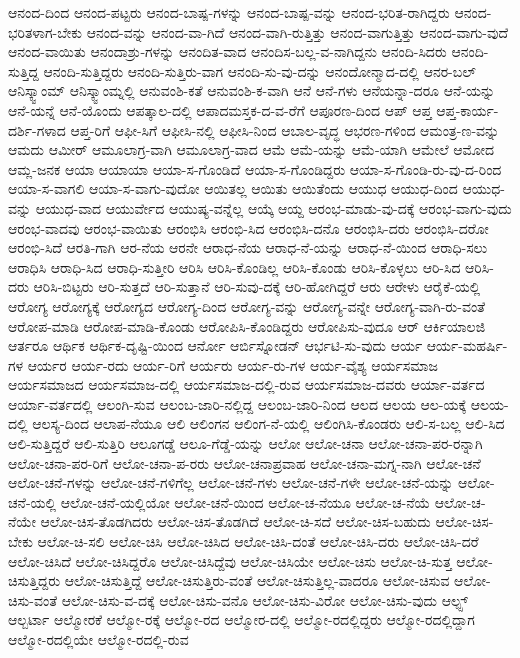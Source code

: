 {ಆನಂದ-ದಿಂದ
ಆನಂದ-ಪಟ್ಟರು
ಆನಂದ-ಬಾಷ್ಪ-ಗಳನ್ನು
ಆನಂದ-ಬಾಷ್ಪ-ವನ್ನು
ಆನಂದ-ಭರಿತ-ರಾಗಿದ್ದರು
ಆನಂದ-ಭರಿತಳಾಗ-ಬೇಕು
ಆನಂದ-ವನ್ನು
ಆನಂದ-ವಾ-ಗಿದೆ
ಆನಂದ-ವಾಗಿ-ರುತ್ತಿತ್ತು
ಆನಂದ-ವಾಗುತ್ತಿತ್ತು
ಆನಂದ-ವಾಗು-ವುದೆ
ಆನಂದ-ವಾಯಿತು
ಆನಂದಾಶ್ರು-ಗಳನ್ನು
ಆನಂದಿತ-ವಾದ
ಆನಂದಿಸ-ಬಲ್ಲ-ವ-ನಾಗಿದ್ದನು
ಆನಂದಿ-ಸಿದರು
ಆನಂದಿ-ಸುತ್ತಿದ್ದ
ಆನಂದಿ-ಸುತ್ತಿದ್ದರು
ಆನಂದಿ-ಸುತ್ತಿರು-ವಾಗ
ಆನಂದಿ-ಸು-ವು-ದನ್ನು
ಆನಂದೋನ್ಮಾದ-ದಲ್ಲಿ
ಆನರ-ಬಲ್
ಆನಿಸ್ಕ್ವಾಂಮ್
ಆನಿಸ್ಕ್ವಾಂಮ್ನಲ್ಲಿ
ಆನುವಂಶಿ-ಕತೆ
ಆನುವಂಶಿ-ಕ-ವಾಗಿ
ಆನೆ
ಆನೆ-ಗಳು
ಆನೆಯನ್ನಾ-ದರೂ
ಆನೆ-ಯನ್ನು
ಆನೆ-ಯನ್ನೆ
ಆನೆ-ಯೊಂದು
ಆಪತ್ಕಾಲ-ದಲ್ಲಿ
ಆಪಾದಮಸ್ತಕ-ದ-ವ-ರೆಗೆ
ಆಪೂರಣ-ದಿಂದ
ಆಪ್
ಆಪ್ತ
ಆಪ್ತ-ಕಾರ್ಯ-ದರ್ಶಿ-ಗಳಾದ
ಆಪ್ತ-ರಿಗೆ
ಆಫೀ-ಸಿಗೆ
ಆಫೀಸಿ-ನಲ್ಲಿ
ಆಫೀಸಿ-ನಿಂದ
ಆಬಾಲ-ವೃದ್ಧ
ಆಭರಣ-ಗಳಿಂದ
ಆಮಂತ್ರ-ಣ-ವನ್ನು
ಆಮದು
ಆಮೀರ್
ಆಮೂಲಾಗ್ರ-ವಾಗಿ
ಆಮೂಲಾಗ್ರ-ವಾದ
ಆಮೆ
ಆಮೆ-ಯನ್ನು
ಆಮೆ-ಯಾಗಿ
ಆಮೇಲೆ
ಆಮೋದ
ಆಮ್ಲ-ಜನಕ
ಆಯಾ
ಆಯಾಯಾ
ಆಯಾ-ಸ-ಗೊಂಡಿದೆ
ಆಯಾ-ಸ-ಗೊಂಡಿದ್ದರು
ಆಯಾ-ಸ-ಗೊಂಡಿ-ರು-ವು-ದ-ರಿಂದ
ಆಯಾ-ಸ-ವಾಗಲಿ
ಆಯಾ-ಸ-ವಾಗು-ವುದೋ
ಆಯಿತಲ್ಲ
ಆಯಿತು
ಆಯಿತೆಂದು
ಆಯುಧ
ಆಯುಧ-ದಿಂದ
ಆಯುಧ-ವನ್ನು
ಆಯುಧ-ವಾದ
ಆಯುರ್ವೇದ
ಆಯುಷ್ಯ-ವನ್ನೆಲ್ಲ
ಆಯ್ಕೆ
ಆಯ್ದ
ಆರಂಭ-ಮಾಡು-ವು-ದಕ್ಕೆ
ಆರಂಭ-ವಾಗು-ವುದು
ಆರಂಭ-ವಾದವು
ಆರಂಭ-ವಾಯಿತು
ಆರಂಭಿಸಿ
ಆರಂಭಿ-ಸಿದ
ಆರಂಭಿಸಿ-ದನೊ
ಆರಂಭಿಸಿ-ದರು
ಆರಂಭಿಸಿ-ದರೋ
ಆರಂಭಿ-ಸಿದೆ
ಆರತಿ-ಗಾಗಿ
ಆರ-ನೆಯ
ಆರನೇ
ಆರಾಧ-ನೆಯ
ಆರಾಧ-ನೆ-ಯನ್ನು
ಆರಾಧ-ನೆ-ಯಿಂದ
ಆರಾಧಿ-ಸಲು
ಆರಾಧಿಸಿ
ಆರಾಧಿ-ಸಿದ
ಆರಾಧಿ-ಸುತ್ತೀರಿ
ಆರಿಸಿ
ಆರಿಸಿ-ಕೊಂಡಿಲ್ಲ
ಆರಿಸಿ-ಕೊಂಡು
ಆರಿಸಿ-ಕೊಳ್ಳಲು
ಆರಿ-ಸಿದ
ಆರಿಸಿ-ದರು
ಆರಿಸಿ-ಬಿಟ್ಟರು
ಆರಿ-ಸುತ್ತದೆ
ಆರಿ-ಸುತ್ತಾನೆ
ಆರಿ-ಸುವು-ದಕ್ಕೆ
ಆರಿ-ಹೋಗಿದ್ದರೆ
ಆರು
ಆರೇಳು
ಆರೈಕೆ-ಯಲ್ಲಿ
ಆರೋಗ್ಯ
ಆರೋಗ್ಯಕ್ಕೆ
ಆರೋಗ್ಯದ
ಆರೋಗ್ಯ-ದಿಂದ
ಆರೋಗ್ಯ-ವನ್ನು
ಆರೋಗ್ಯ-ವನ್ನೇ
ಆರೋಗ್ಯ-ವಾಗಿ-ರು-ವಂತೆ
ಆರೋಪ-ಮಾಡಿ
ಆರೋಪ-ಮಾಡಿ-ಕೊಂಡು
ಆರೋಪಿಸಿ-ಕೊಂಡಿದ್ದರು
ಆರೋಪಿಸು-ವುದೂ
ಆರ್
ಆರ್ಕಿಯಾಲಜಿ
ಆರ್ತರೂ
ಆರ್ಥಿಕ
ಆರ್ಥಿಕ-ದೃಷ್ಟಿ-ಯಿಂದ
ಆರ್ನೋ
ಆರ್ಬಿಸ್ನೋಡನ್
ಆರ್ಭಟಿ-ಸು-ವುದು
ಆರ್ಯ
ಆರ್ಯ-ಮಹರ್ಷಿ-ಗಳ
ಆರ್ಯರ
ಆರ್ಯ-ರದು
ಆರ್ಯ-ರಿಗೆ
ಆರ್ಯರು
ಆರ್ಯ-ರು-ಗಳ
ಆರ್ಯ-ವೈಶ್ಯ
ಆರ್ಯಸಮಾಜ
ಆರ್ಯಸಮಾಜದ
ಆರ್ಯಸಮಾಜ-ದಲ್ಲಿ
ಆರ್ಯಸಮಾಜ-ದಲ್ಲಿ-ರುವ
ಆರ್ಯಸಮಾಜ-ದವರು
ಆರ್ಯಾ-ವರ್ತದ
ಆರ್ಯಾ-ವರ್ತದಲ್ಲಿ
ಆಲಂಗಿ-ಸುವ
ಆಲಂಬ-ಜಾರಿ-ನಲ್ಲಿದ್ದ
ಆಲಂಬ-ಜಾರಿ-ನಿಂದ
ಆಲದ
ಆಲಯ
ಆಲ-ಯಕ್ಕೆ
ಆಲಯ-ದಲ್ಲಿ
ಆಲಸ್ಯ-ದಿಂದ
ಆಲಾಪ-ನೆಯೂ
ಆಲಿ
ಆಲಿಂಗನ
ಆಲಿಂಗ-ನೆ-ಯಲ್ಲಿ
ಆಲಿಂಗಿಸಿ-ಕೊಂಡರು
ಆಲಿ-ಸ-ಬಲ್ಲ
ಆಲಿ-ಸಿದ
ಆಲಿ-ಸುತ್ತಿದ್ದರೆ
ಆಲಿ-ಸುತ್ತಿರಿ
ಆಲೂಗಡ್ಡೆ
ಆಲೂ-ಗೆಡ್ಡೆ-ಯನ್ನು
ಆಲೋ
ಆಲೋ-ಚನಾ
ಆಲೋ-ಚನಾ-ಪರ-ರನ್ನಾಗಿ
ಆಲೋ-ಚನಾ-ಪರ-ರಿಗೆ
ಆಲೋ-ಚನಾ-ಪ-ರರು
ಆಲೋ-ಚನಾಪ್ರವಾಹ
ಆಲೋ-ಚನಾ-ಮಗ್ನ-ನಾಗಿ
ಆಲೋ-ಚನೆ
ಆಲೋ-ಚನೆ-ಗಳನ್ನು
ಆಲೋ-ಚನೆ-ಗಳಿಗೆಲ್ಲ
ಆಲೋ-ಚನೆ-ಗಳು
ಆಲೋ-ಚನೆ-ಗಳೇ
ಆಲೋ-ಚನೆ-ಯನ್ನು
ಆಲೋ-ಚನೆ-ಯಲ್ಲಿ
ಆಲೋ-ಚನೆ-ಯಲ್ಲಿಯೋ
ಆಲೋ-ಚನೆ-ಯಿಂದ
ಆಲೋ-ಚ-ನೆಯೂ
ಆಲೋ-ಚ-ನೆಯೆ
ಆಲೋ-ಚ-ನೆಯೇ
ಆಲೋ-ಚಿಸ-ತೊಡಗಿದರು
ಆಲೋ-ಚಿಸ-ತೊಡಗಿದೆ
ಆಲೋ-ಚಿ-ಸದೆ
ಆಲೋ-ಚಿಸ-ಬಹುದು
ಆಲೋ-ಚಿಸ-ಬೇಕು
ಆಲೋ-ಚಿ-ಸಲಿ
ಆಲೋ-ಚಿಸಿ
ಆಲೋ-ಚಿಸಿದ
ಆಲೋ-ಚಿಸಿ-ದಂತೆ
ಆಲೋ-ಚಿಸಿ-ದರು
ಆಲೋ-ಚಿಸಿ-ದರೆ
ಆಲೋ-ಚಿಸಿದೆ
ಆಲೋ-ಚಿಸಿದ್ದರೊ
ಆಲೋ-ಚಿಸಿದ್ದೆವು
ಆಲೋ-ಚಿಸಿಯೇ
ಆಲೋ-ಚಿಸು
ಆಲೋ-ಚಿ-ಸುತ್ತ
ಆಲೋ-ಚಿಸುತ್ತಿದ್ದರು
ಆಲೋ-ಚಿಸುತ್ತಿದ್ದೆ
ಆಲೋ-ಚಿಸುತ್ತಿರು-ವಂತೆ
ಆಲೋ-ಚಿಸುತ್ತಿಲ್ಲ-ವಾದರೂ
ಆಲೋ-ಚಿಸುವ
ಆಲೋ-ಚಿಸು-ವಂತೆ
ಆಲೋ-ಚಿಸು-ವ-ದಕ್ಕೆ
ಆಲೋ-ಚಿಸು-ವನೊ
ಆಲೋ-ಚಿಸು-ವಿರೋ
ಆಲೋ-ಚಿಸು-ವುದು
ಆಲ್ಫ್ಸ್
ಆಲ್ಬರ್ಟಾ
ಆಲ್ಮೋರಕೆ
ಆಲ್ಮೋ-ರಕ್ಕೆ
ಆಲ್ಮೋ-ರದ
ಆಲ್ಮೋರ-ದಲ್ಲಿ
ಆಲ್ಮೋ-ರದಲ್ಲಿದ್ದರು
ಆಲ್ಮೋ-ರದಲ್ಲಿದ್ದಾಗ
ಆಲ್ಮೋ-ರದಲ್ಲಿಯೇ
ಆಲ್ಮೋ-ರದಲ್ಲಿ-ರುವ
}
